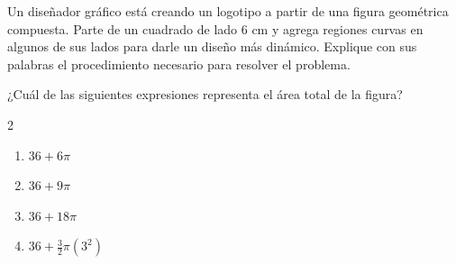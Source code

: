 Un diseñador gráfico está creando un logotipo a partir de una figura geométrica compuesta. Parte de un cuadrado de lado 6 cm y agrega regiones curvas en algunos de sus lados para darle un diseño más dinámico. Explique con sus palabras el procedimiento necesario para resolver el problema.

\begin{center}
\end{center}

¿Cuál de las siguientes expresiones representa el área total de la figura?

\begin{multicols}{2}
\begin{enumerate}[label=\alph*), leftmargin=*]
\item $36 + 6\pi$
\item $36 + 9\pi$
\item $36 + 18\pi$
\item $36 + \frac{3}{2}\pi(3^2)$
\end{enumerate}
\end{multicols}